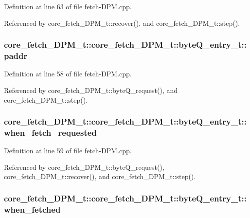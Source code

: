 Definition at line 63 of file fetch-DPM.cpp.

Referenced by core\_\-fetch\_\-DPM\_\-t::recover(), and core\_\-fetch\_\-DPM\_\-t::step().
\subsubsection[{paddr}]{ core\_\-fetch\_\-DPM\_\-t::core\_\-fetch\_\-DPM\_\-t::byteQ\_\-entry\_\-t::paddr}\label{structcore__fetch__DPM__t_1_1byteQ__entry__t_f19d2979eee3884de053a0671beec72a}




Definition at line 58 of file fetch-DPM.cpp.

Referenced by core\_\-fetch\_\-DPM\_\-t::byteQ\_\-request(), and core\_\-fetch\_\-DPM\_\-t::step().
\subsubsection[{when\_\-fetch\_\-requested}]{ core\_\-fetch\_\-DPM\_\-t::core\_\-fetch\_\-DPM\_\-t::byteQ\_\-entry\_\-t::when\_\-fetch\_\-requested}\label{structcore__fetch__DPM__t_1_1byteQ__entry__t_1f56a664ebe5212d7c883c6b74c81558}




Definition at line 59 of file fetch-DPM.cpp.

Referenced by core\_\-fetch\_\-DPM\_\-t::byteQ\_\-request(), core\_\-fetch\_\-DPM\_\-t::recover(), and core\_\-fetch\_\-DPM\_\-t::step().
\subsubsection[{when\_\-fetched}]{ core\_\-fetch\_\-DPM\_\-t::core\_\-fetch\_\-DPM\_\-t::byteQ\_\-entry\_\-t::when\_\-fetched}\label{structcore__fetch__DPM__t_1_1byteQ__entry__t_ebb4e3f153646807d669aa44ef6168be}




